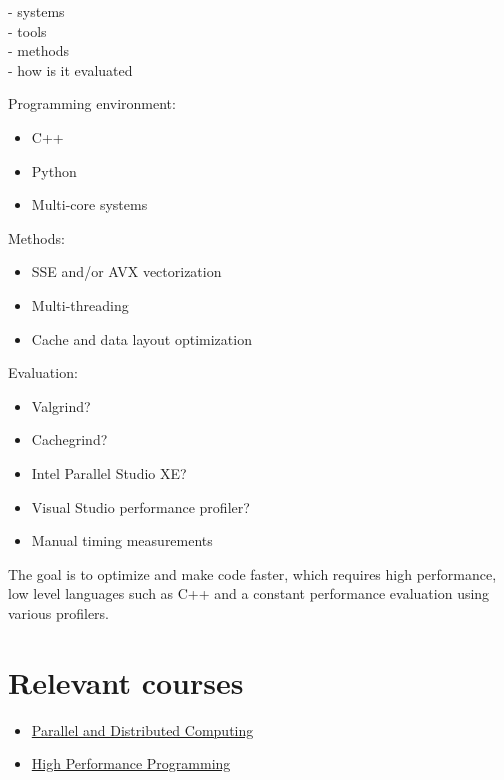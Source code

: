 \documentclass[12pt]{article}
\begin{document}
	\color{red}
	- systems \\
	- tools \\
	- methods \\
	- how is it evaluated \\
	\color{black}
	
	Programming environment:
	\begin{itemize}
		\item C++
		\item Python
		\item Multi-core systems
	\end{itemize}

	Methods:
	\begin{itemize}
		\item SSE and/or AVX vectorization
		\item Multi-threading
		\item Cache and data layout optimization
	\end{itemize}

	Evaluation:
	\begin{itemize}
		\color{blue}
		\item Valgrind?
		\item Cachegrind?
		\item Intel Parallel Studio XE?
		\item Visual Studio performance profiler?
		\color{black}
		\item Manual timing measurements
	\end{itemize}

	The goal is to optimize and make code faster, which requires high performance, low level languages such as C++ and a constant performance evaluation using various profilers.



	\newpage
	\section{Relevant courses}
	
	\begin{itemize}
		\item \href{http://www.uu.se/en/admissions/master/selma/kursplan/?kpid=31898&type=1}
			{Parallel and Distributed Computing}
		
		\item \href{http://www.uu.se/en/admissions/master/selma/kursplan/?kpid=31897&lasar=18%2F19&typ=1}
			{High Performance Programming}	
	\end{itemize}
\end{document}
